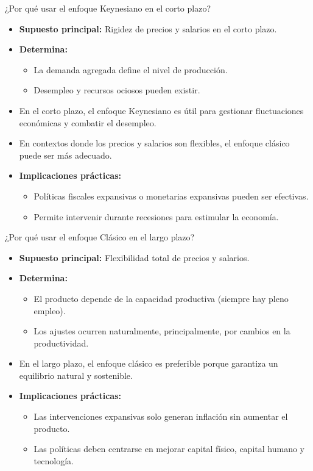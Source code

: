 \documentclass{beamer}
\begin{document}
\begin{frame}{¿Por qué usar el enfoque Keynesiano en el corto plazo?}
    \begin{itemize}
        \item \textbf{Supuesto principal:} Rigidez de precios y salarios en el corto plazo.
        \item \textbf{Determina:}
        \begin{itemize}
            \item La demanda agregada define el nivel de producción.
            \item Desempleo y recursos ociosos pueden existir.
        \end{itemize}
        \item En el corto plazo, el enfoque Keynesiano es útil para gestionar fluctuaciones económicas y combatir el desempleo.
        \item En contextos donde los precios y salarios son flexibles, el enfoque clásico puede ser más adecuado.
        \item \textbf{Implicaciones prácticas:}
        \begin{itemize}
            \item Políticas fiscales expansivas o monetarias expansivas pueden ser efectivas.
            \item Permite intervenir durante recesiones para estimular la economía.
        \end{itemize}
    \end{itemize}
\end{frame}

\begin{frame}{¿Por qué usar el enfoque Clásico en el largo plazo?}
    \begin{itemize}
        \item \textbf{Supuesto principal:} Flexibilidad total de precios y salarios.
        \item \textbf{Determina:}
        \begin{itemize}
            \item El producto depende de la capacidad productiva (siempre hay pleno empleo).
            \item Los ajustes ocurren naturalmente, principalmente, por cambios en la productividad.
        \end{itemize}
        \item En el largo plazo, el enfoque clásico es preferible porque garantiza un equilibrio natural y sostenible.
        \item \textbf{Implicaciones prácticas:}
        \begin{itemize}
            \item Las intervenciones expansivas solo generan inflación sin aumentar el producto.
            \item Las políticas deben centrarse en mejorar capital físico, capital humano y tecnología.
        \end{itemize}
    \end{itemize}
\end{frame}



\end{document}
